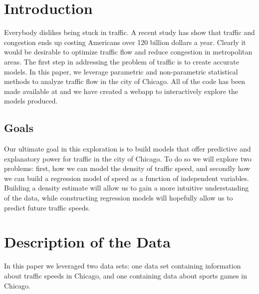 \documentclass[12pt]{article}
\begin{document}
\maketitle
\section{Introduction}
Everybody dislikes being stuck in traffic. A recent study has show that traffic and congestion ends up costing Americans over 120 billion dollars a year\cite{costoftraffic}. Clearly it would be desirable to optimize traffic flow and reduce congestion in metropolitan areas. The first step in addressing the problem of traffic is to create accurate models. In this paper, we leverage parametric and non-parametric statistical methods to analyze traffic flow in the city of Chicago. All of the code has been made available at \cite{github} and we have created a webapp \cite{trafficapp} to interactively explore the models produced.
\subsection{Goals}
Our ultimate goal in this exploration is to build models that offer predictive and explanatory power for traffic in the city of Chicago. To do so we will explore two problems: first, how we can model the density of traffic speed, and secondly how we can build a regression model of speed as a function of independent variables. Building a density estimate will allow us to gain a more intuitive understanding of the data, while constructing regression models will hopefully allow us to predict future traffic speeds.
\section{Description of the Data}
In this paper we leveraged two data sets: one data set containing information about traffic speeds in Chicago, and one containing data about sports games in Chicago.
\end{document}
